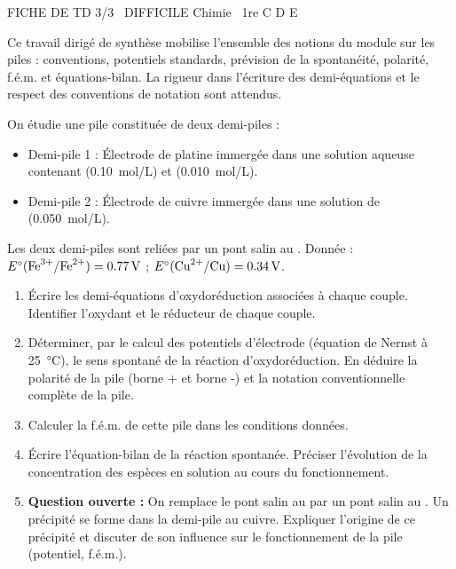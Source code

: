\documentclass[11pt]{article}
\begin{document}
\begin{tcolorbox}[enhanced,colback=popink,colframe=popink,arc=10pt,boxrule=0pt,left=12pt,right=12pt,top=9pt,bottom=9pt]
{\color{white}\popxbold\small FICHE DE TD 3/3 \textbullet\ DIFFICILE \hfill Chimie \textbullet\ 1re C D E\par}
\end{tcolorbox}
\vspace{4pt}
Ce travail dirigé de synthèse mobilise l'ensemble des notions du module sur les piles : conventions, potentiels standards, prévision de la spontanéité, polarité, f.é.m. et équations-bilan. La rigueur dans l'écriture des demi-équations et le respect des conventions de notation sont attendus.

\begin{exercice}
On étudie une pile constituée de deux demi-piles : 
\begin{itemize}
    \item Demi-pile 1 : Électrode de platine immergée dans une solution aqueuse contenant  (\SI{0,10}{mol/L}) et  (\SI{0,010}{mol/L}).
    \item Demi-pile 2 : Électrode de cuivre immergée dans une solution de  (\SI{0,050}{mol/L}).
\end{itemize}
Les deux demi-piles sont reliées par un pont salin au . Donnée : $E^\circ(\ce{Fe^{3+}/Fe^{2+}}) = \SI{+0,77}{V}$ ; $E^\circ(\ce{Cu^{2+}/Cu}) = \SI{+0,34}{V}$.
\begin{enumerate}
    \item Écrire les demi-équations d'oxydoréduction associées à chaque couple. Identifier l'oxydant et le réducteur de chaque couple.
    \item Déterminer, par le calcul des potentiels d'électrode (équation de Nernst à \SI{25}{\celsius}), le sens spontané de la réaction d'oxydoréduction. En déduire la polarité de la pile (borne + et borne -) et la notation conventionnelle complète de la pile.
    \item Calculer la f.é.m. de cette pile dans les conditions données.
    \item Écrire l'équation-bilan de la réaction spontanée. Préciser l'évolution de la concentration des espèces en solution au cours du fonctionnement.
    \item \textbf{Question ouverte :} On remplace le pont salin au  par un pont salin au . Un précipité se forme dans la demi-pile au cuivre. Expliquer l'origine de ce précipité et discuter de son influence sur le fonctionnement de la pile (potentiel, f.é.m.).
\end{enumerate}
\end{exercice}
\end{document}
